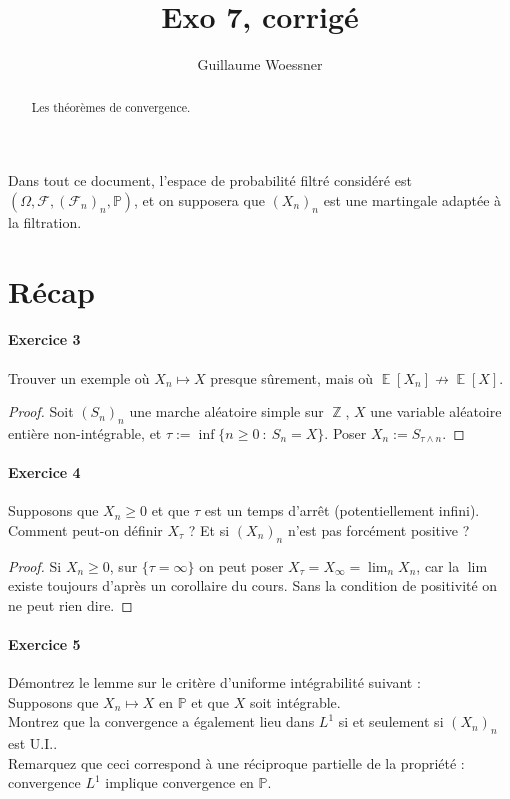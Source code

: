 \documentclass{article}
\title{Exo 7, corrigé}
\author{Guillaume Woessner}
\date{}                       %
\theoremstyle{definition}
\numberwithin{equation}{section}
\DeclareMathOperator{\Z}{\mathbb{Z}}
\DeclareMathOperator{\E}{\mathbb{E}}
\begin{document}
\maketitle                    %

\begin{abstract}
\begin{center}
Les théorèmes de convergence.
\end{center}
\end{abstract}



Dans tout ce document, l'espace de probabilité filtré considéré est $(\Omega,\mathcal{F},(\mathcal{F}_n)_n,\mathbb{P})$, et on supposera que $(X_n)_n$ est une martingale adaptée à la filtration.


\section{Récap}

\paragraph{Exercice 3} Trouver un exemple où $X_n\mapsto X$ presque sûrement, mais où $\E[X_n]\nrightarrow \E[X]$.

\begin{proof}
Soit $(S_n)_n$ une marche aléatoire simple sur $\Z$, $X$ une variable aléatoire entière non-intégrable, et $\tau:=\inf\{n\geq 0 ~:~S_n=X\}$. Poser $X_n := S_{\tau\wedge n}$.
\end{proof}


\paragraph{Exercice 4} 
Supposons que $X_n\geq 0$ et que $\tau$ est un temps d'arrêt (potentiellement infini).\\
Comment peut-on définir $X_\tau$ ? Et si $(X_n)_n$ n'est pas forcément positive ?

\begin{proof}
Si $X_n\geq 0$, sur $\{\tau=\infty\}$ on peut poser $X_\tau=X_\infty=\lim_n X_n$, car la $\lim$ existe toujours d'après un corollaire du cours. Sans la condition de positivité on ne peut rien dire.
\end{proof}


\paragraph{Exercice 5} Démontrez le lemme sur le critère d'uniforme intégrabilité suivant :\\
Supposons que $X_n\mapsto X$ en $\mathbb{P}$ et que $X$ soit intégrable.\\
Montrez que la convergence a également lieu dans $L^1$ si et seulement si $(X_n)_n$ est U.I..\\
Remarquez que ceci correspond à une réciproque partielle de la propriété : convergence $L^1$ implique convergence en $\mathbb{P}$. 
\end{document}
